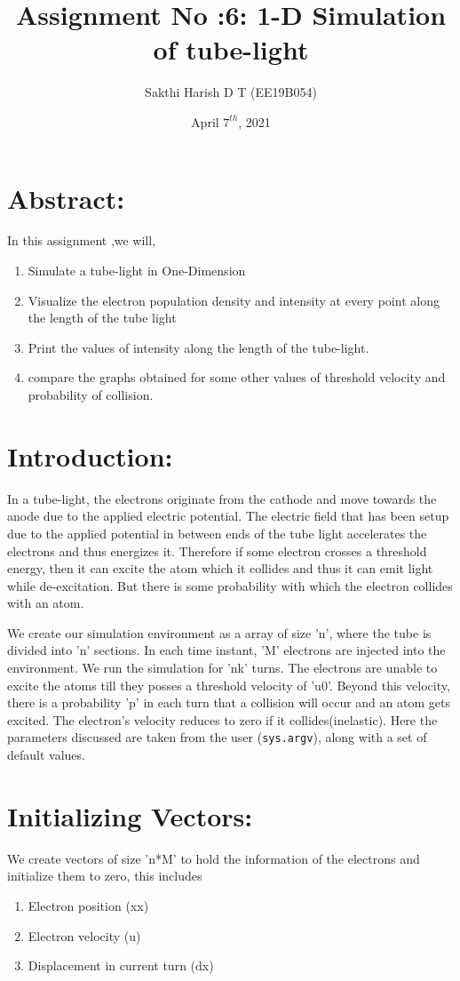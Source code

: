 \documentclass[11pt, a4paper]{article}
\title{Assignment No :6: 1-D Simulation of tube-light}
\author{Sakthi Harish D T (EE19B054)}
\date{April $7^{th}$, 2021}
\begin{document}
		
		
\maketitle 
\section{Abstract:}
In this assignment ,we will,
\begin{enumerate}
    \item Simulate a tube-light in One-Dimension 
    \item Visualize the electron population density and intensity at every point along the length of the tube light
    \item Print the values of intensity along the length of the tube-light.
    \item compare the graphs obtained for some other values of threshold velocity and probability of collision.
\end{enumerate}

\section{Introduction:}
In a tube-light, the electrons originate from the cathode and move towards the anode due to the applied electric potential. The electric field that has been setup due to the applied potential in between ends of the tube light accelerates the electrons and thus energizes it. Therefore if some electron crosses a threshold energy, then it can excite the atom which it collides and thus it can emit light while de-excitation. But there is some probability with which the electron collides with an atom.
\newline

We create our simulation environment as a array of size 'n', where the tube is divided into 'n' sections. In each time instant, 'M' electrons are injected into the environment. We run the simulation for 'nk' turns. The electrons are unable to excite the atoms till they posses a threshold velocity of 'u0'. Beyond this velocity, there is a probability 'p' in each turn that a collision will occur and an atom gets excited. The electron’s velocity reduces to zero if it collides(inelastic). Here the parameters discussed are taken from the user (\texttt{sys.argv}), along with a set of default values.

\section{Initializing Vectors:}
We create vectors of size 'n*M' to hold the information of the electrons and initialize them to zero, this includes 
\begin{enumerate}
    \item Electron position (xx)
    \item Electron velocity (u)
    \item Displacement in current turn (dx)
\end{enumerate}
\end{document}
